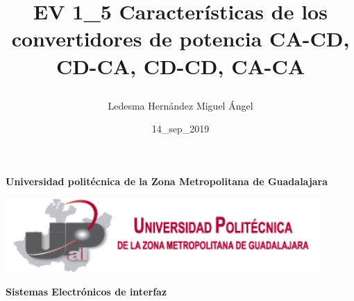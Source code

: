\documentclass[a3paper,12pt]{article}
\title{\begin{huge}
 EV 1\_5 Características de los convertidores de potencia CA-CD, CD-CA, CD-CD, CA-CA
\end{huge}\vspace{1.5cm} }
\author{\vspace{.5cm}\begin{huge}Ledesma Hernández Miguel Ángel\end{huge}}
\date{14\_sep\_2019}
\begin{document}
\pagestyle{plain}
	\pagestyle{empty}
		\changepage{3cm}{1cm}{-0.5cm}{-0.5cm}{}{-2cm}{}{}{}
		
	\maketitle	

	
	
\vspace{13cm}
	\begin{center}
		\begin{large}
		\begin{LARGE}
			\textbf{Universidad politécnica de la Zona Metropolitana de Guadalajara}
			\begin{center}
\includegraphics[width=12cm]{logo.png}	
\end{center} \vspace{3cm}
			\textbf{Sistemas Electrónicos de interfaz}
		\end{LARGE}
			\\[0.4cm]
		\end{large}
	\end{center}


\clearpage







\end{document}
